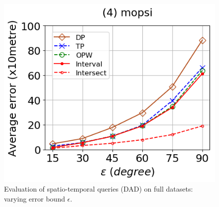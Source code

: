 \begin{figure}[tb!]
	\includegraphics[scale = 0.320]{Figures/Exp-query-DAD-error-epsilon-mopsi.png}\hspace{3ex}
	\caption{\small Evaluation of spatio-temporal queries (DAD) on full datasets: varying error bound $\epsilon$.}
	\label{fig:query-dad-epsilon}
\end{figure}



